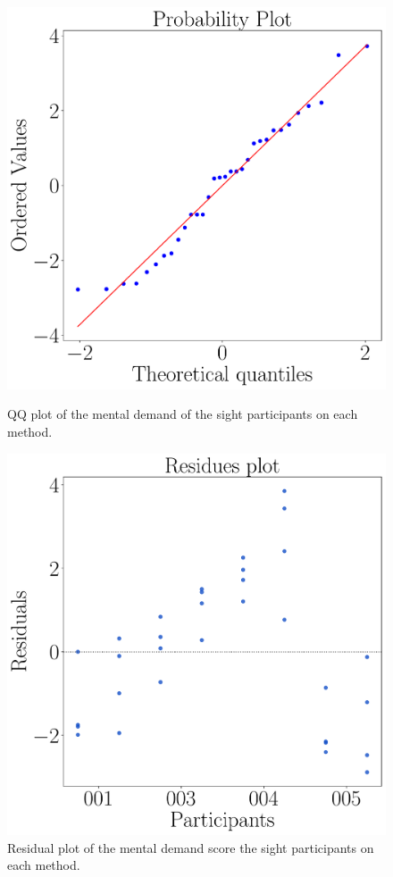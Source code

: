 \begin{figure}[!thb]
    \centering
    \vspace{-15.0cm}
    \begin{minipage}{0.45\textwidth}
        \centering
        \includegraphics[width = 0.8\linewidth]{Resultados/Sagat/Figuras/pdf/qqplot_sagat_avg_two_way_sight.pdf}
        \caption{QQ plot of the mental demand of the sight participants on each method.}
        \label{fig:qqplot_sagat_avg_two_way_sight}
    \end{minipage}
    \begin{minipage}{0.075\textwidth}
        \hfill
    \end{minipage}
    \begin{minipage}{0.45\textwidth}
        \centering
        \includegraphics[width = 0.8\linewidth]{Resultados/Sagat/Figuras/pdf/residplot_sagat_avg_two_way_sight.pdf}
        \caption{Residual plot of the mental demand score the sight participants on each method.}
        \label{fig:residplot_sagat_avg_two_way_sight}
    \end{minipage}
\end{figure}


\FloatBarrier